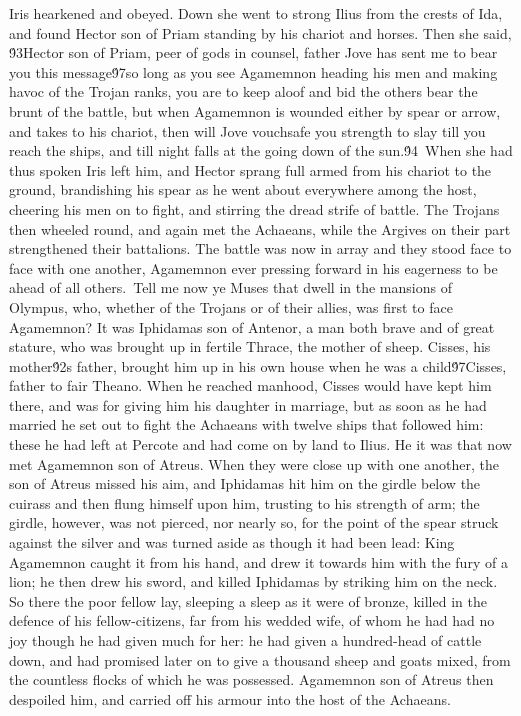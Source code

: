 {Iris hearkened and obeyed. Down she went to strong Ilius from the crests of Ida, and found Hector son of Priam standing by his chariot and horses. Then she said, \'93Hector son of Priam, peer of gods in counsel, father Jove has sent me to bear you this message\'97so long as you see Agamemnon heading his men and making havoc of the Trojan ranks, you are to keep aloof and bid the others bear the brunt of the battle, but when Agamemnon is wounded either by spear or arrow, and takes to his chariot, then will Jove vouchsafe you strength to slay till you reach the ships, and till night falls at the going down of the sun.\'94\
When she had thus spoken Iris left him, and Hector sprang full armed from his chariot to the ground, brandishing his spear as he went about everywhere among the host, cheering his men on to fight, and stirring the dread strife of battle. The Trojans then wheeled round, and again met the Achaeans, while the Argives on their part strengthened their battalions. The battle was now in array and they stood face to face with one another, Agamemnon ever pressing forward in his eagerness to be ahead of all others.\
Tell me now ye Muses that dwell in the mansions of Olympus, who, whether of the Trojans or of their allies, was first to face Agamemnon? It was Iphidamas son of Antenor, a man both brave and of great stature, who was brought up in fertile Thrace, the mother of sheep. Cisses, his mother\'92s father, brought him up in his own house when he was a child\'97Cisses, father to fair Theano. When he reached manhood, Cisses would have kept him there, and was for giving him his daughter in marriage, but as soon as he had married he set out to fight the Achaeans with twelve ships that followed him: these he had left at Percote and had come on by land to Ilius. He it was that now met Agamemnon son of Atreus. When they were close up with one another, the son of Atreus missed his aim, and Iphidamas hit him on the girdle below the cuirass and then flung himself upon him, trusting to his strength of arm; the girdle, however, was not pierced, nor nearly so, for the point of the spear struck against the silver and was turned aside as though it had been lead: King Agamemnon caught it from his hand, and drew it towards him with the fury of a lion; he then drew his sword, and killed Iphidamas by striking him on the neck. So there the poor fellow lay, sleeping a sleep as it were of bronze, killed in the defence of his fellow-citizens, far from his wedded wife, of whom he had had no joy though he had given much for her: he had given a hundred-head of cattle down, and had promised later on to give a thousand sheep and goats mixed, from the countless flocks of which he was possessed. Agamemnon son of Atreus then despoiled him, and carried off his armour into the host of the Achaeans.\
}
